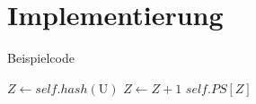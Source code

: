\section{Implementierung}

\begin{frame}{Beispielcode}
        \begin{algorithmic}
                \State $Z \gets self.hash(\textrm{U})$
                    $Z \gets Z + 1$
                \EndWhile
                \State\Return $self.PS[Z]$
            \EndFunction
            \State
            \State
            \State
            \small\cite{github_knirschl}\normalsize
        \end{algorithmic}
\end{frame}